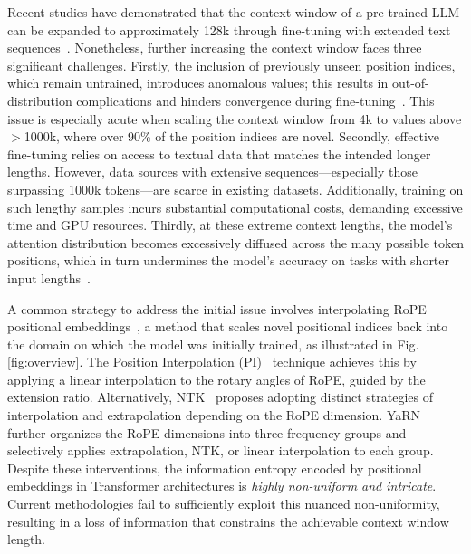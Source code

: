 Recent studies have demonstrated that the context window of a pre-trained LLM can be expanded to approximately 128k through fine-tuning with extended text sequences~\cite{longlora,pi,yarn,zhang2024soaring,liu2023scaling}. Nonetheless, further increasing the context window faces three significant challenges. Firstly, the inclusion of previously unseen position indices, which remain untrained, introduces anomalous values; this results in out-of-distribution complications and hinders convergence during fine-tuning~\cite{pi}. This issue is especially acute when scaling the context window from 4k to values above $>$1000k, where over 90\% of the position indices are novel. Secondly, effective fine-tuning relies on access to textual data that matches the intended longer lengths. However, data sources with extensive sequences—especially those surpassing 1000k tokens—are scarce in existing datasets. Additionally, training on such lengthy samples incurs substantial computational costs, demanding excessive time and GPU resources. Thirdly, at these extreme context lengths, the model’s attention distribution becomes excessively diffused across the many possible token positions, which in turn undermines the model’s accuracy on tasks with shorter input lengths~\cite{pi}.

A common strategy to address the initial issue involves interpolating RoPE positional embeddings~\cite{rope,pi}, a method that scales novel positional indices back into the domain on which the model was initially trained, as illustrated in Fig.\ref{fig:overview}. The Position Interpolation (PI)~\cite{pi} technique achieves this by applying a linear interpolation to the rotary angles of RoPE, guided by the extension ratio. Alternatively, NTK~\cite{ntk,dynamicntk} proposes adopting distinct strategies of interpolation and extrapolation depending on the RoPE dimension. YaRN~\cite{yarn} further organizes the RoPE dimensions into three frequency groups and selectively applies extrapolation, NTK, or linear interpolation to each group. Despite these interventions, the information entropy encoded by positional embeddings in Transformer architectures is \emph{highly non-uniform and intricate}. Current methodologies fail to sufficiently exploit this nuanced non-uniformity, resulting in a loss of information that constrains the achievable context window length.

